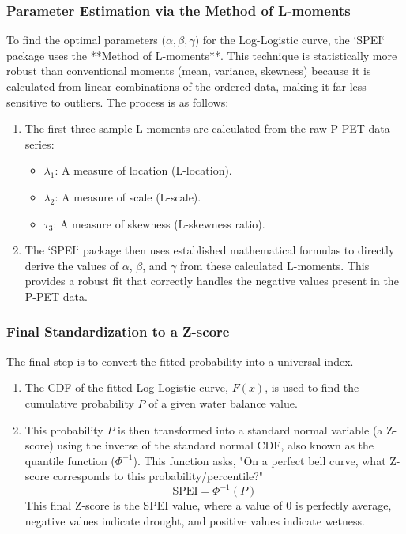 \documentclass[12pt, a4paper]{article}
\begin{document}
\subsubsection{Parameter Estimation via the Method of L-moments}
To find the optimal parameters ($\alpha, \beta, \gamma$) for the Log-Logistic curve, the `SPEI` package uses the **Method of L-moments**. This technique is statistically more robust than conventional moments (mean, variance, skewness) because it is calculated from linear combinations of the ordered data, making it far less sensitive to outliers. The process is as follows:
\begin{enumerate}
    \item The first three sample L-moments are calculated from the raw P-PET data series:
    \begin{itemize}
        \item $\lambda_1$: A measure of location (L-location).
        \item $\lambda_2$: A measure of scale (L-scale).
        \item $\tau_3$: A measure of skewness (L-skewness ratio).
    \end{itemize}
    \item The `SPEI` package then uses established mathematical formulas to directly derive the values of $\alpha$, $\beta$, and $\gamma$ from these calculated L-moments. This provides a robust fit that correctly handles the negative values present in the P-PET data.
\end{enumerate}

\subsubsection{Final Standardization to a Z-score}
The final step is to convert the fitted probability into a universal index.
\begin{enumerate}
    \item The CDF of the fitted Log-Logistic curve, $F(x)$, is used to find the cumulative probability $P$ of a given water balance value.
    \item This probability $P$ is then transformed into a standard normal variable (a Z-score) using the inverse of the standard normal CDF, also known as the quantile function ($\Phi^{-1}$). This function asks, "On a perfect bell curve, what Z-score corresponds to this probability/percentile?"
    \[ \text{SPEI} = \Phi^{-1}(P) \]
    This final Z-score is the SPEI value, where a value of 0 is perfectly average, negative values indicate drought, and positive values indicate wetness.
\end{enumerate}
\end{document}

